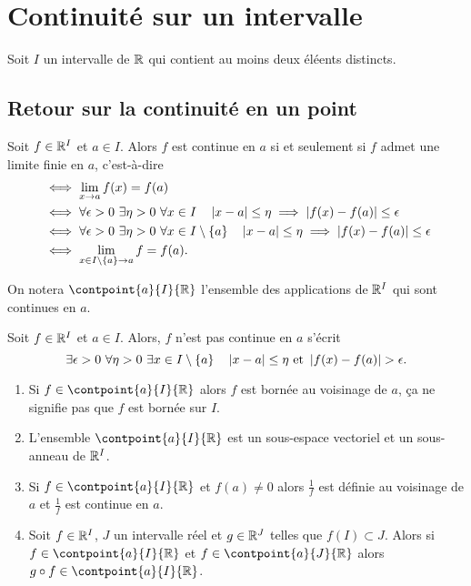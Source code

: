 \section{Continuité sur un intervalle}

Soit $I$ un intervalle de $\mathbb{R}$ qui contient au moins deux éléents distincts.

\subsection{Retour sur la continuité en un point}

\begin{rappel}
  Soit $f \in \mathbb{R}^I$ et $a \in I$. Alors $f$ est continue en $a$ si et seulement si $f$ admet une limite finie en $a$, c'est-à-dire
  \begin{align}
    &\iff \lim\limits_{x \to a} f(x) = f(a)\\
    &\iff \forall \epsilon>0 \ \exists \eta>0 \ \forall x \in I \quad \left\lvert x-a\right\rvert \leq \eta \implies \left\lvert f(x)-f(a)\right\rvert \leq \epsilon\\
    &\iff \forall \epsilon>0 \ \exists \eta>0 \ \forall x \in I\setminus\{a\} \quad \left\lvert x-a\right\rvert \leq \eta \implies \left\lvert f(x)-f(a)\right\rvert \leq \epsilon\\
    &\iff \lim\limits_{x \in I\setminus\{a\} \to a } f = f(a).
  \end{align}
\end{rappel}
On notera $\contpoint{a}{I}{\R}$ l'ensemble des applications de $\mathbb{R}^I$ qui sont continues en $a$.

\begin{rappel}
  Soit $f \in \mathbb{R}^I$ et $a \in I$. Alors, $f$ n'est pas continue en $a$ s'écrit
  \begin{equation}
    \exists \epsilon >0 \ \forall \eta >0 \ \exists x \in I\setminus\{a\} \quad \left\lvert x-a\right\rvert \leq \eta \text{~et~} \left\lvert f(x)-f(a)\right\rvert > \epsilon.
  \end{equation}
\end{rappel}

\begin{prop}
  \begin{enumerate}
  \item Si $f \in \contpoint{a}{I}{\R}$ alors $f$ est bornée au voisinage de $a$, ça ne signifie pas que $f$ est bornée sur $I$.
  \item L'ensemble $\contpoint{a}{I}{\R}$ est un sous-espace vectoriel et un sous-anneau de $\mathbb{R}^I$.
  \item Si $f \in \contpoint{a}{I}{\R}$ et $f(a) \neq 0$ alors $\frac{1}{f}$ est définie au voisinage de $a$ et $\frac{1}{f}$ est continue en $a$.
  \item Soit $f \in \mathbb{R}^I$, $J$ un intervalle réel et $g \in \mathbb{R}^J$ telles que $f(I) \subset J$. Alors si $f \in \contpoint{a}{I}{\R}$ et $f \in \contpoint{a}{J}{\R}$ alors $g \circ f \in \contpoint{a}{I}{\R}$.
  \end{enumerate}
\end{prop}

